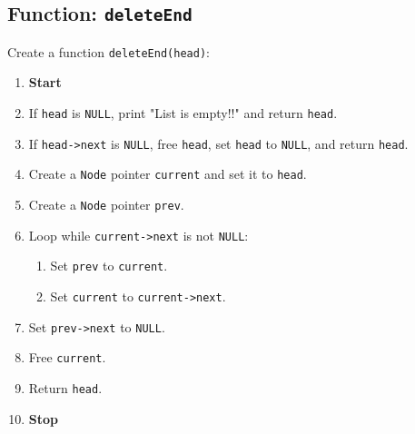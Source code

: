 {  \subsection{Function: \texttt{deleteEnd}}
  Create a function \texttt{deleteEnd(head)}:
  \begin{enumerate}[label=\arabic*:,left=0pt]
    \item \textbf{Start}
    \item If \texttt{head} is \texttt{NULL}, print "List is empty!!" and return \texttt{head}.
    \item If \texttt{head->next} is \texttt{NULL}, free \texttt{head}, set \texttt{head} to \texttt{NULL}, and return \texttt{head}.
    \item Create a \texttt{Node} pointer \texttt{current} and set it to \texttt{head}.
    \item Create a \texttt{Node} pointer \texttt{prev}.
    \item Loop while \texttt{current->next} is not \texttt{NULL}:
          \begin{enumerate}[label=2.\arabic*:, start=1]
            \item Set \texttt{prev} to \texttt{current}.
            \item Set \texttt{current} to \texttt{current->next}.
          \end{enumerate}
    \item Set \texttt{prev->next} to \texttt{NULL}.
    \item Free \texttt{current}.
    \item Return \texttt{head}.
    \item \textbf{Stop}
  \end{enumerate}

}
